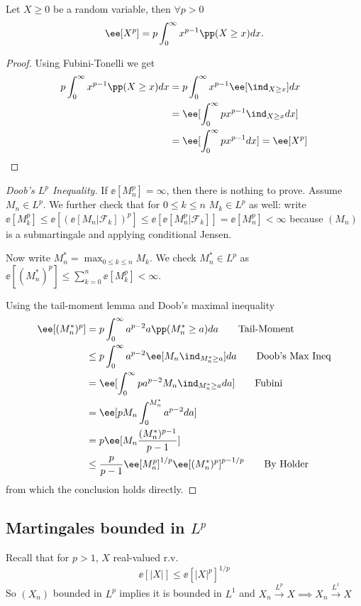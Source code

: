 \documentclass[../main.tex]{subfiles}
\begin{document}
\begin{lemma}
  Let $X \geq 0$ be a random variable, then $\forall p > 0$
  \[
    \ee[X^p] = p \int_{0}^\infty x^{p-1} \pp(X \geq x) dx
  .\] 
\end{lemma}
\begin{proof}
    Using Fubini-Tonelli we get
    \begin{align*}
      p \int_{0}^\infty x^{p-1} \pp(X \geq x) dx 
      &= p \int_{0}^\infty x^{p-1} \ee[\ind_{X \geq x}] dx \\
      &= \ee [\int_{0}^{\infty} px^{p-1} \ind_{X \geq x} dx] \\
      &= \ee[\int_0^\infty p x^{p-1}dx] = \ee[X^p]
    \end{align*}
\end{proof}
\begin{proof}
  [Doob's $L^p$ Inequality]
  If $\ee[M_n^p] = \infty$, then there is nothing to prove. Assume $M_n \in
  L^p$. We further check that for $0 \leq k \leq n$ $M_k \in L^p$ as well: 
  write $\ee[M_k^p] \leq \ee[(\ee[M_n | \mathcal{F}_k])^p] \leq \ee[\ee[M_n^p
  | \mathcal{F}_k]] = \ee[M_n^p] < \infty$ because $(M_n)$ is
  a submartingale and applying conditional Jensen.

  Now write $M_n^* = \max_{0 \leq k \leq n} M_k$. We check $M_n^* \in L^p$ as
  $\ee[(M_n^*)^p] \leq \sum_{k=0}^n \ee[M_k^p] < \infty$.

  Using the tail-moment lemma and Doob's maximal inequality
  \begin{align*}
    \ee[(M_n^*)^p] &= p \int_{0}^\infty a^{p-2} a\pp(M_n^* \geq a) da
    \tag*{Tail-Moment}\\
    &\leq p \int_{0}^\infty a^{p-2} \ee[M_n \ind_{M_n^* \geq a}] da
    \tag*{Doob's Max Ineq}\\
    &= \ee[\int_{0}^\infty pa^{p-2} M_n \ind_{M_n^* \geq a} da] \tag*{Fubini}\\
    &= \ee[p M_n \int_{0}^{M_n^*} a^{p-2}da] \\
    &= p \ee[M_n \frac{(M_n^{*})^{p-1}}{p-1} ] \\
    &\leq \frac{p}{p-1} \ee[M_n^p]^{1/p} \ee[(M_n^*)^p]^{p-1/p} \tag*{By
    Holder} \\
  \end{align*}
  from which the conclusion holds directly.
\end{proof}

\subsection{Martingales bounded in $L^p$}
Recall that for $p>1$, $X$ real-valued r.v. 
\[
  \ee[|X|] \leq \ee[|X|^p]^{1/p}
\] 
So $(X_n)$ bounded in $L^p$ implies it is bounded in $L^1$ and $X_n
\overset{L^p}{\longrightarrow} X \implies X_n \overset{L^1}{\longrightarrow}X$
\end{document}
